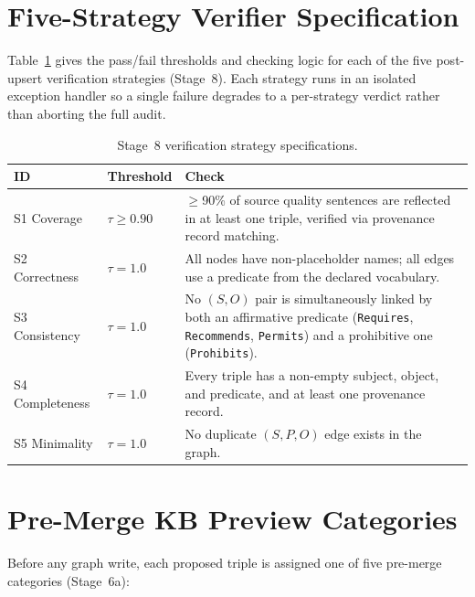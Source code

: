 \section{Five-Strategy Verifier Specification}
\label{app:verifier}

Table~\ref{tab:verifier} gives the pass/fail thresholds and checking
logic for each of the five post-upsert verification strategies
(Stage~8).  Each strategy runs in an isolated exception handler so a
single failure degrades to a per-strategy verdict rather than aborting
the full audit.

\begin{table}[h]
\centering
\small
\caption{Stage~8 verification strategy specifications.}
\label{tab:verifier}
\begin{tabularx}{\columnwidth}{llX}
\toprule
\textbf{ID} & \textbf{Threshold} & \textbf{Check} \\
\midrule
S1 Coverage      & $\tau \geq 0.90$ & $\geq$90\% of source quality sentences are reflected in at least one triple, verified via provenance record matching. \\[4pt]
S2 Correctness   & $\tau = 1.0$     & All nodes have non-placeholder names; all edges use a predicate from the declared vocabulary. \\[4pt]
S3 Consistency   & $\tau = 1.0$     & No $(S, O)$ pair is simultaneously linked by both an affirmative predicate (\texttt{Requires}, \texttt{Recommends}, \texttt{Permits}) and a prohibitive one (\texttt{Prohibits}). \\[4pt]
S4 Completeness  & $\tau = 1.0$     & Every triple has a non-empty subject, object, and predicate, and at least one provenance record. \\[4pt]
S5 Minimality    & $\tau = 1.0$     & No duplicate $(S, P, O)$ edge exists in the graph. \\
\bottomrule
\end{tabularx}
\end{table}

\section{Pre-Merge KB Preview Categories}
\label{app:preview-categories}

Before any graph write, each proposed triple is assigned one of five
pre-merge categories (Stage~6a):

